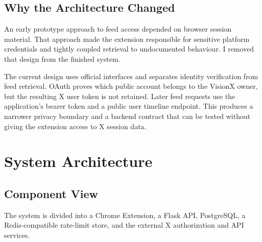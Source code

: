 \documentclass[11pt,a4paper]{report}
\begin{document}
\section{Why the Architecture Changed}
An early prototype approach to feed access depended on browser session
material. That approach made the extension responsible for sensitive platform
credentials and tightly coupled retrieval to undocumented behaviour. I removed
that design from the finished system.

The current design uses official interfaces and separates identity
verification from feed retrieval. OAuth proves which public account belongs to
the VisionX owner, but the resulting X user token is not retained. Later feed
requests use the application's bearer token and a public user timeline
endpoint. This produces a narrower privacy boundary and a backend contract that
can be tested without giving the extension access to X session data.

\chapter{System Architecture}

\section{Component View}
The system is divided into a Chrome Extension, a Flask API, PostgreSQL, a
Redis-compatible rate-limit store, and the external X authorization and API
services.
\end{document}

